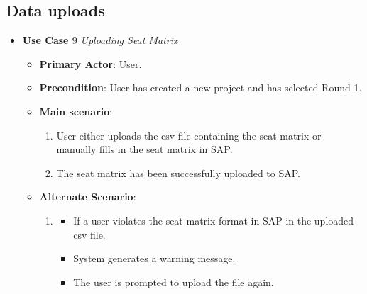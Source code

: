 \documentclass{report}
\begin{document}
\subsection{Data uploads}
\begin{tcolorbox}[colframe=white, colback=lightblue, arc=8pt]

\begin{itemize}
    \item \textbf{Use Case $9$} \textit{Uploading Seat Matrix
}\\
    \begin{itemize}
        \item \textbf{Primary Actor}: User.
        \item \textbf{Precondition}: User has created a new project and has selected Round 1.
        \item \textbf{Main scenario}: \begin{enumerate}
            \item User either uploads the csv file containing the seat matrix or manually fills in the seat matrix in SAP. 
            \item The seat matrix has been successfully uploaded to SAP.
        \end{enumerate}
       \item \textbf{Alternate Scenario}: 
       \begin{enumerate}
           \item 
           \begin{itemize} 
           \item If a user violates the seat matrix format in SAP in the uploaded csv file.
            \item System generates a warning message.
            \item The user is prompted to upload the file again.
           \end{itemize}
       \end{enumerate}
    \end{itemize}
\end{itemize}   


\end{tcolorbox}
\end{document}
